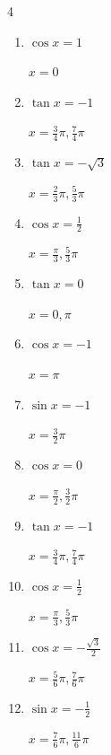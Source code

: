 \begin{multicols}{4}
\begin{enumerate}
  \item $\displaystyle \cos{x}  = 1$

        $\displaystyle x = 0$

  \item $\displaystyle \tan{x}  = -1$

        $\displaystyle x = \frac{3}{4}\pi , \frac{7}{4}\pi$

  \item $\displaystyle \tan{x}  = -\sqrt{3}$

        $\displaystyle x = \frac{2}{3}\pi , \frac{5}{3}\pi$

  \item $\displaystyle \cos{x}  = \frac{1}{2}$

        $\displaystyle x = \frac{\pi}{3} , \frac{5}{3}\pi$

  \item $\displaystyle \tan{x}  = 0$

        $\displaystyle x = 0 , \pi$

  \item $\displaystyle \cos{x}  = -1$

        $\displaystyle x = \pi$

\columnbreak %

\resetques

  \item $\displaystyle \sin{x}  = -1$

        $\displaystyle x = \frac{3}{2}\pi$

  \item $\displaystyle \cos{x}  = 0$

        $\displaystyle x = \frac{\pi}{2} , \frac{3}{2}\pi$

  \item $\displaystyle \tan{x}  = -1$

        $\displaystyle x = \frac{3}{4}\pi , \frac{7}{4}\pi$

  \item $\displaystyle \cos{x}  = \frac{1}{2}$

        $\displaystyle x = \frac{\pi}{3} , \frac{5}{3}\pi$

  \item $\displaystyle \cos{x}  = -\frac{\sqrt{3}}{2}$

        $\displaystyle x = \frac{5}{6}\pi , \frac{7}{6}\pi$

  \item $\displaystyle \sin{x}  = -\frac{1}{2}$

        $\displaystyle x = \frac{7}{6}\pi , \frac{11}{6}\pi$


\end{enumerate}
\end{multicols}
